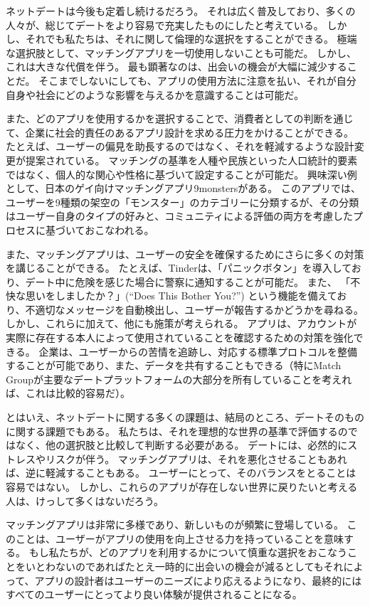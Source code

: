 \documentclass[paper=a4,book,openany]{jlreq} \usepackage{mystyle}
\begin{document}
ネットデートは今後も定着し続けるだろう。
それは広く普及しており、多くの人々が、総じてデートをより容易で充実したものにしたと考えている。
しかし、それでも私たちは、それに関して倫理的な選択をすることができる。
極端な選択肢として、マッチングアプリを一切使用しないことも可能だ。
しかし、これは大きな代償を伴う。
最も顕著なのは、出会いの機会が大幅に減少することだ。
そこまでしないにしても、アプリの使用方法に注意を払い、それが自分自身や社会にどのような影響を与えるかを意識することは可能だ。

また、どのアプリを使用するかを選択することで、消費者としての判断を通じて、企業に社会的責任のあるアプリ設計を求める圧力をかけることができる。
たとえば、ユーザーの偏見を助長するのではなく、それを軽減するような設計変更が提案されている。
マッチングの基準を人種や民族といった人口統計的要素ではなく、個人的な関心や性格に基づいて設定することが可能だ。
興味深い例として、日本のゲイ向けマッチングアプリ{9monsters}がある。
このアプリでは、ユーザーを9種類の架空の「モンスター」のカテゴリーに分類するが、その分類はユーザー自身のタイプの好みと、コミュニティによる評価の両方を考慮したプロセスに基づいておこなわれる\citep{miksche17:_meet_gay_app,hutson18:_debias_desir}。

また、マッチングアプリは、ユーザーの安全を確保するためにさらに多くの対策を講じることができる。
たとえば、Tinderは、「パニックボタン」を導入しており、デート中に危険を感じた場合に警察に通知することが可能だ。
また、 「不快な思いをしましたか？」(``Does This Bother You?'') という機能を備えており、不適切なメッセージを自動検出し、ユーザーが報告するかどうかを尋ねる。
しかし、これらに加えて、他にも施策が考えられる。
アプリは、アカウントが実際に存在する本人によって使用されていることを確認するための対策を強化できる。
企業は、ユーザーからの苦情を追跡し、対応する標準プロトコルを整備することが可能であり、また、データを共有することもできる（特にMatch Groupが主要なデートプラットフォームの大部分を所有していることを考えれば、これは比較的容易だ）。

とはいえ、ネットデートに関する多くの課題は、結局のところ、デートそのものに関する課題でもある。
私たちは、それを理想的な世界の基準で評価するのではなく、他の選択肢と比較して判断する必要がある。
デートには、必然的にストレスやリスクが伴う。
マッチングアプリは、それを悪化させることもあれば、逆に軽減することもある。
ユーザーにとって、そのバランスをとることは容易ではない。
しかし、これらのアプリが存在しない世界に戻りたいと考える人は、けっして多くはないだろう。

マッチングアプリは非常に多様であり、新しいものが頻繁に登場している。
このことは、ユーザーがアプリの使用を向上させる力を持っていることを意味する。
もし私たちが、どのアプリを利用するかについて慎重な選択をおこなうことをいとわないのであれば{\DDASH}たとえ一時的に出会いの機会が減るとしても{\DDASH}それによって、アプリの設計者はユーザーのニーズにより応えるようになり、最終的にはすべてのユーザーにとってより良い体験が提供されることになる。
\end{document}
